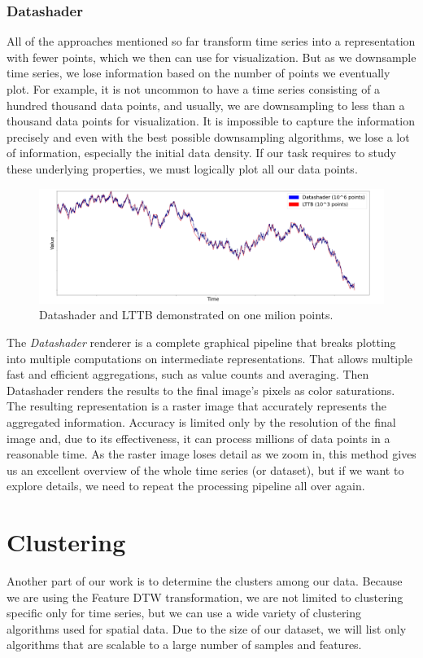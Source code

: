 \subsubsection{Datashader}
All of the approaches mentioned so far transform time series into a representation with fewer points, which we then can use for visualization. But as we downsample time series, we lose information based on the number of points we eventually plot. For example, it is not uncommon to have a time series consisting of a hundred thousand data points, and usually, we are downsampling to less than a thousand data points for visualization. It is impossible to capture the information precisely and even with the best possible downsampling algorithms, we lose a lot of information, especially the initial data density. If our task requires to study these underlying properties, we must logically plot all our data points.
\begin{figure}[tbh]
    \centering
     \includegraphics[width=\textwidth]{img/datashader.png}
    \caption{Datashader and LTTB demonstrated on one milion points.}
    \label{fig:my_label}
\end{figure}

The \textit{Datashader} renderer \cite{vis:datashader} is a complete graphical pipeline that breaks plotting into multiple computations on intermediate representations.
That allows multiple fast and efficient aggregations, such as value counts and averaging. Then Datashader renders the results to the final image's pixels as color saturations. The resulting representation is a raster image that accurately represents the aggregated information. Accuracy is limited only by the resolution of the final image and, due to its effectiveness, it can process millions of data points in a reasonable time. As the raster image loses detail as we zoom in, this method gives us an excellent overview of the whole time series (or dataset), but if we want to explore details, we need to repeat the processing pipeline all over again.

\section{Clustering}
Another part of our work is to determine the clusters among our data. Because we are using the Feature DTW transformation, we are not limited to clustering specific only for time series, but we can use a wide variety of clustering algorithms used for spatial data. Due to the size of our dataset, we will list only algorithms that are scalable to a large number of samples and features.

